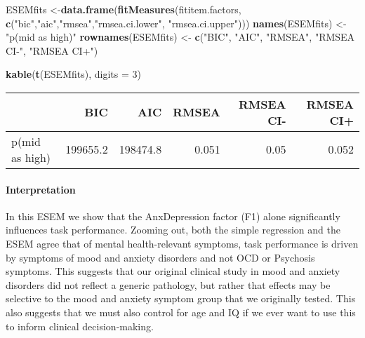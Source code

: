 \documentclass[]{article}
\newenvironment{Shaded}{\begin{snugshade}}{\end{snugshade}}
\newcommand{\KeywordTok}[1]{\textcolor[rgb]{0.13,0.29,0.53}{\textbf{#1}}}
\newcommand{\DataTypeTok}[1]{\textcolor[rgb]{0.13,0.29,0.53}{#1}}
\newcommand{\DecValTok}[1]{\textcolor[rgb]{0.00,0.00,0.81}{#1}}
\newcommand{\StringTok}[1]{\textcolor[rgb]{0.31,0.60,0.02}{#1}}
\newcommand{\NormalTok}[1]{#1}
\let\oldparagraph\paragraph
\renewcommand{\paragraph}[1]{\oldparagraph{#1}\mbox{}}
\begin{document}
\begin{Shaded}
\begin{Highlighting}[]
\NormalTok{ESEMfits <-}\KeywordTok{data.frame}\NormalTok{(}\KeywordTok{fitMeasures}\NormalTok{(fititem.factors, }\KeywordTok{c}\NormalTok{(}\StringTok{"bic"}\NormalTok{,}\StringTok{"aic"}\NormalTok{,}\StringTok{"rmsea"}\NormalTok{,}\StringTok{"rmsea.ci.lower"}\NormalTok{, }\StringTok{"rmsea.ci.upper"}\NormalTok{)))}
\KeywordTok{names}\NormalTok{(ESEMfits) <-}\StringTok{ "p(mid as high)"}
\KeywordTok{rownames}\NormalTok{(ESEMfits) <-}\StringTok{ }\KeywordTok{c}\NormalTok{(}\StringTok{"BIC"}\NormalTok{, }\StringTok{"AIC"}\NormalTok{, }\StringTok{"RMSEA"}\NormalTok{, }\StringTok{"RMSEA CI-"}\NormalTok{, }\StringTok{"RMSEA CI+"}\NormalTok{)}

\KeywordTok{kable}\NormalTok{(}\KeywordTok{t}\NormalTok{(ESEMfits), }\DataTypeTok{digits =} \DecValTok{3}\NormalTok{)}
\end{Highlighting}
\end{Shaded}

\begin{longtable}[]{@{}lrrrrr@{}}
\toprule
& BIC & AIC & RMSEA & RMSEA CI- & RMSEA CI+\tabularnewline
\midrule
\endhead
p(mid as high) & 199655.2 & 198474.8 & 0.051 & 0.05 &
0.052\tabularnewline
\bottomrule
\end{longtable}

\paragraph{Interpretation}\label{interpretation-6}

In this ESEM we show that the AnxDepression factor (F1) alone
significantly influences task performance. Zooming out, both the simple
regression and the ESEM agree that of mental health-relevant symptoms,
task performance is driven by symptoms of mood and anxiety disorders and
not OCD or Psychosis symptoms. This suggests that our original clinical
study in mood and anxiety disorders did not reflect a generic pathology,
but rather that effects may be selective to the mood and anxiety symptom
group that we originally tested. This also suggests that we must also
control for age and IQ if we ever want to use this to inform clinical
decision-making.
\end{document}
